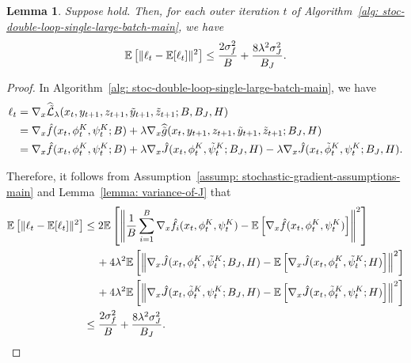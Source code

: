 \documentclass{article}
\theoremstyle{plain}
\newtheorem{lemma}{Lemma}
\theoremstyle{definition}
\theoremstyle{remark}
\def\E{\mathbb E}
\def\cL{\mathcal L}
\begin{document}
\begin{lemma}
    \label{lemma: estimation-error-of-ell-gradient}
Suppose  hold.
Then, for each outer iteration $t$ of
Algorithm~\ref{alg: stoc-double-loop-single-large-batch-main}, we have
    \begin{align}
        \E \left[ \|\ell_t - \E[\ell_t ] \|^2 \right] \leq \frac{2 \sigma_f^2}{B} + \frac{8 \lambda^2 \sigma_J^2}{B_J}. \notag
    \end{align} 
\end{lemma}
\begin{proof}
    In Algorithm~\ref{alg: stoc-double-loop-single-large-batch-main}, we have
    \begin{align}
        \ell_t & = \nabla_x\widehat{\tilde{\cL}}_\lambda(x_t, y_{t+1}, z_{t+1}, \tilde{y}_{t+1}, \tilde{z}_{t+1}; B, B_J, H) \notag \\
        & = \nabla_x \hat{f}(x_t,\phi_t^K, \psi_t^K;B) + \lambda \nabla_x \widehat{\tilde{g}}(x_t,y_{t+1},z_{t+1},\tilde{y}_{t+1},\tilde{z}_{t+1};B_J,H) \notag \\
        & = \nabla_x \hat{f}(x_t,\phi_t^K, \psi_t^K;B) + \lambda \nabla_x \hat{J}(x_t,\phi_t^K,\tilde{\psi}_t^K;B_J,H) - \lambda \nabla_x \hat{J}(x_t,\tilde{\phi}_t^K,\psi_t^K;B_J,H).
    \end{align}

    Therefore, it follows from Assumption~\ref{assump: stochastic-gradient-assumptions-main} and Lemma~\ref{lemma: variance-of-J} that 
    \begin{align}
         \E \left[ \|\ell_t - \E[\ell_t ] \|^2 \right] & \leq 2 \E \left[ \left\| \frac{1}{B} \sum_{i=1}^{B} \nabla_x \hat{f}_i(x_t,\phi_t^K, \psi_t^K) - \E \left[ \nabla_x \hat{f}(x_t,\phi_t^K, \psi_t^K) \right] \right\|^2  \right]  \notag \\ 
       & \quad \, + 4 \lambda^2 \E \left[ \left\| \nabla_x \hat{J}(x_t,\phi_t^K,\tilde{\psi}_t^K;B_J,H) - \E \left[ \nabla_x \hat{J}(x_t,\phi_t^K,\tilde{\psi}_t^K;H) \right]\right\|^2 \right] \notag \\ 
       & \quad \, + 4 \lambda^2 \E \left[ \left\| \nabla_x \hat{J}(x_t,\tilde{\phi}_t^K,\psi_t^K;B_J,H) - \E \left[ \nabla_x \hat{J}(x_t,\tilde{\phi}_t^K,\psi_t^K;H) \right]\right\|^2 \right] \notag \\
       & \leq \frac{2 \sigma_f^2}{B} + \frac{8 \lambda^2 \sigma_J^2}{B_J}.
    \end{align}
\end{proof}
\end{document}
